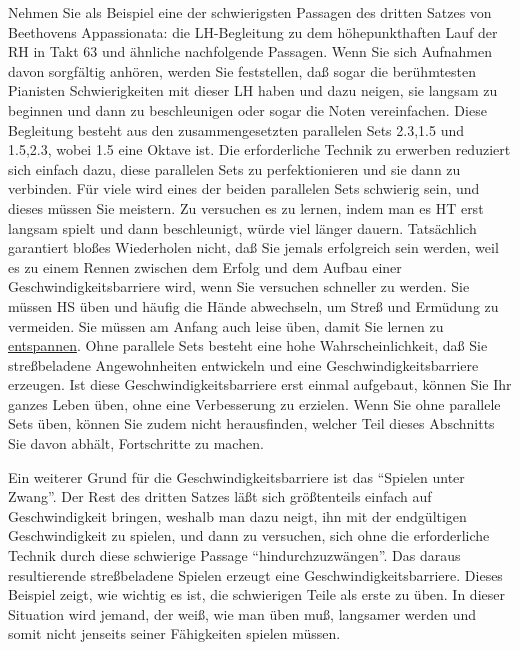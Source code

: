 Nehmen Sie als Beispiel eine der schwierigsten Passagen des dritten Satzes von Beethovens Appassionata: die LH-Begleitung zu dem höhepunkthaften Lauf der RH in Takt 63 und ähnliche nachfolgende Passagen.
Wenn Sie sich Aufnahmen davon sorgfältig anhören, werden Sie feststellen, daß sogar die berühmtesten Pianisten Schwierigkeiten mit dieser LH haben und dazu neigen, sie langsam zu beginnen und dann zu beschleunigen oder sogar die Noten vereinfachen.
Diese Begleitung besteht aus den zusammengesetzten parallelen Sets 2.3,1.5 und 1.5,2.3, wobei 1.5 eine Oktave ist.
Die erforderliche Technik zu erwerben reduziert sich einfach dazu, diese parallelen Sets zu perfektionieren und sie dann zu verbinden.
Für viele wird eines der beiden parallelen Sets schwierig sein, und dieses müssen Sie meistern.
Zu versuchen es zu lernen, indem man es HT erst langsam spielt und dann beschleunigt, würde viel länger dauern.
Tatsächlich garantiert bloßes Wiederholen nicht, daß Sie jemals erfolgreich sein werden, weil es zu einem Rennen zwischen dem Erfolg und dem Aufbau einer Geschwindigkeitsbarriere wird, wenn Sie versuchen schneller zu werden.
Sie müssen HS üben und häufig die Hände abwechseln, um Streß und Ermüdung zu vermeiden.
Sie müssen am Anfang auch leise üben, damit Sie lernen zu \hyperref[c1ii14]{entspannen}.
Ohne parallele Sets besteht eine hohe Wahrscheinlichkeit, daß Sie streßbeladene Angewohnheiten entwickeln und eine Geschwindigkeitsbarriere erzeugen.
Ist diese Geschwindigkeitsbarriere erst einmal aufgebaut, können Sie Ihr ganzes Leben üben, ohne eine Verbesserung zu erzielen.
Wenn Sie ohne parallele Sets üben, können Sie zudem nicht herausfinden, welcher Teil dieses Abschnitts Sie davon abhält, Fortschritte zu machen.

Ein weiterer Grund für die Geschwindigkeitsbarriere ist das \enquote{Spielen unter Zwang}.
Der Rest des dritten Satzes läßt sich größtenteils einfach auf Geschwindigkeit bringen, weshalb man dazu neigt, ihn mit der endgültigen Geschwindigkeit zu spielen, und dann zu versuchen, sich ohne die erforderliche Technik durch diese schwierige Passage \enquote{hindurchzuzwängen}.
Das daraus resultierende streßbeladene Spielen erzeugt eine Geschwindigkeitsbarriere.
Dieses Beispiel zeigt, wie wichtig es ist, die schwierigen Teile als erste zu üben.
In dieser Situation wird jemand, der weiß, wie man üben muß, langsamer werden und somit nicht jenseits seiner Fähigkeiten spielen müssen.

